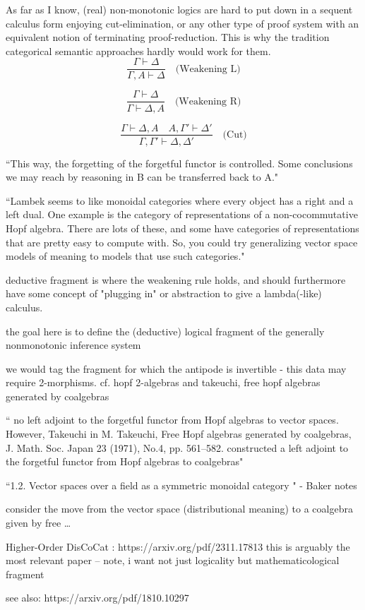 \documentclass[a4paper,11pt]{report}
\begin{document}
As far as I know, (real) non-monotonic logics are hard to put down in a sequent calculus form enjoying cut-elimination, or any other type of proof system with an equivalent notion of terminating proof-reduction. This is why the tradition categorical semantic approaches hardly would work for them.
\[
\frac{\Gamma \vdash \Delta}{\Gamma, A \vdash \Delta} \quad \text{(Weakening L)}
\]

\[
\frac{\Gamma \vdash \Delta}{\Gamma \vdash \Delta, A} \quad \text{(Weakening R)}
\]

\[
\frac{\Gamma \vdash \Delta, A \quad A, \Gamma' \vdash \Delta'}{\Gamma, \Gamma' \vdash \Delta, \Delta'} \quad \text{(Cut)}
\]


``This way, the forgetting of the forgetful functor is controlled.
Some conclusions we may reach by reasoning in B can be transferred
back to A." 

``Lambek seems to like monoidal categories where every object has a right and a left dual. One example is the category of representations of a non-cocommutative Hopf algebra. There are lots of these, and some have categories of representations that are pretty easy to compute with. So, you could try generalizing vector space models of meaning to models that use such categories."

deductive fragment is where the weakening rule holds, and should furthermore have some concept of "plugging in" or abstraction to give a lambda(-like) calculus. 

the goal here is to define the (deductive) logical fragment of the generally nonmonotonic inference system 

we would tag the fragment for which the antipode is invertible - this data may require 2-morphisms. cf. hopf 2-algebras and takeuchi, free hopf algebras generated by coalgebras

`` no left adjoint to the forgetful functor from Hopf algebras to vector spaces. However, Takeuchi in M. Takeuchi, Free Hopf algebras generated by coalgebras, J. Math. Soc. Japan 23 (1971), No.4, pp. 561–582.
constructed a left adjoint to the forgetful functor from Hopf algebras to coalgebras"

``1.2. Vector spaces over a field as a symmetric monoidal category
" - Baker notes

consider the move from the vector space (distributional meaning) to a coalgebra given by free \dots

Higher-Order DisCoCat : https://arxiv.org/pdf/2311.17813
this is arguably the most relevant paper -- note, i want not just logicality but mathematicological fragment 

see also: https://arxiv.org/pdf/1810.10297
\end{document}
